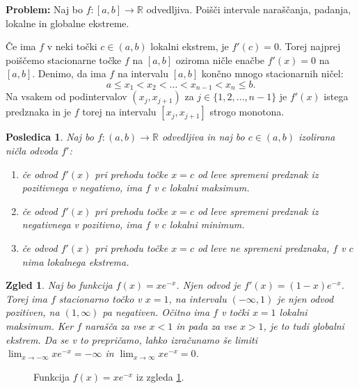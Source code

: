 \documentclass[10pt, a4paper]{article}
\newtheorem{posledica}[izr]{Posledica}
\newtheorem{zgled}{Zgled}[section]
\newcommand{\R}{\mathbb {R}}
\newcommand{\limf}[3]{\lim_{#1 \to #2} {#3}}
\begin{document}
\textbf{Problem:} Naj bo $f: [a, b] \rightarrow \R$ odvedljiva. 
Poišči intervale naraščanja, padanja, lokalne in globalne ekstreme.

Če ima $f$ v neki točki $c \in (a, b)$ lokalni ekstrem, je $f'(c) = 0.$
Torej najprej poiščemo stacionarne točke $f$ na $[a, b]$ oziroma ničle enačbe $f'(x) = 0$ na $[a, b]$.
Denimo, da ima $f$ na intervalu $[a, b]$ končno mnogo stacionarnih ničel:
$$a \leq x_1 < x_2 < \dots < x_{n-1} < x_n \leq b.$$
Na vsakem od podintervalov $(x_j, x_{j+1})$ za $j \in \{1, 2, \dots, n-1\}$ je $f'(x)$ istega predznaka in je $f$ torej na intervalu $[x_j, x_{j+1}]$ strogo monotona.

\begin{posledica}
    Naj bo $f: (a,b) \rightarrow \R$ odvedljiva in naj bo $c \in (a, b)$ izolirana ničla odvoda $f'$:
    \begin{enumerate}
        \item če odvod $f'(x)$ pri prehodu točke $x = c$ od leve spremeni predznak iz pozitivnega v negativno, ima $f$ v $c$ lokalni maksimum.
        \item če odvod $f'(x)$ pri prehodu točke $x = c$ od leve spremeni predznak iz negativnega v pozitivno, ima $f$ v $c$ lokalni minimum.
        \item če odvod $f'(x)$ pri prehodu točke $x = c$ od leve ne spremeni predznaka, $f$ v $c$ nima lokalnega ekstrema.
    \end{enumerate}
\end{posledica}

\begin{zgled}
    \label{zgl:4}
    Naj bo funkcija $f(x) = x e^{-x}$. 
    Njen odvod je $f'(x) = (1-x)e^{-x}$.
    Torej ima $f$ stacionarno točko v $x = 1$, na intervalu $(-\infty, 1)$ je njen odvod pozitiven, na $(1,\infty)$ pa negativen.
    Očitno ima $f$ v točki $x = 1$ lokalni maksimum.
    Ker $f$ narašča za vse $x < 1$ in pada za vse $x > 1$, je to tudi globalni ekstrem.
    Da se v to prepričamo, lahko izračunamo še limiti $\limf{x}{-\infty}{xe^{-x}} = -\infty$ in $\limf{x}{\infty}{xe^{-x}} = 0$.
\end{zgled}

\begin{figure}[hbt!]
    \centering
    \caption{Funkcija $f(x) = x e^{-x}$ iz zgleda \ref{zgl:4}.}
\end{figure}
\end{document}
